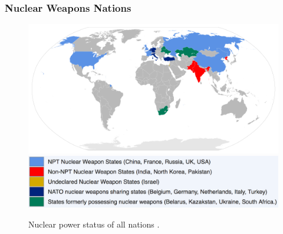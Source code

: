 \begin{frame}
  \frametitle{Nuclear Weapons Nations}
  \begin{figure}[htbp!]
    \begin{center}
      \includegraphics[width=\textwidth]{./images/nuclear-weapons-map.png}\\

\vspace{-10mm}
      \includegraphics[height=0.2\textheight]{./images/nuclear-weapons-legend.png}
    \end{center}
          \caption{Nuclear power status of all nations 
          \cite{paleogene_file:nuclear_2017}.}
    \label{fig:nuc-nations-map}
  \end{figure}
\end{frame}




